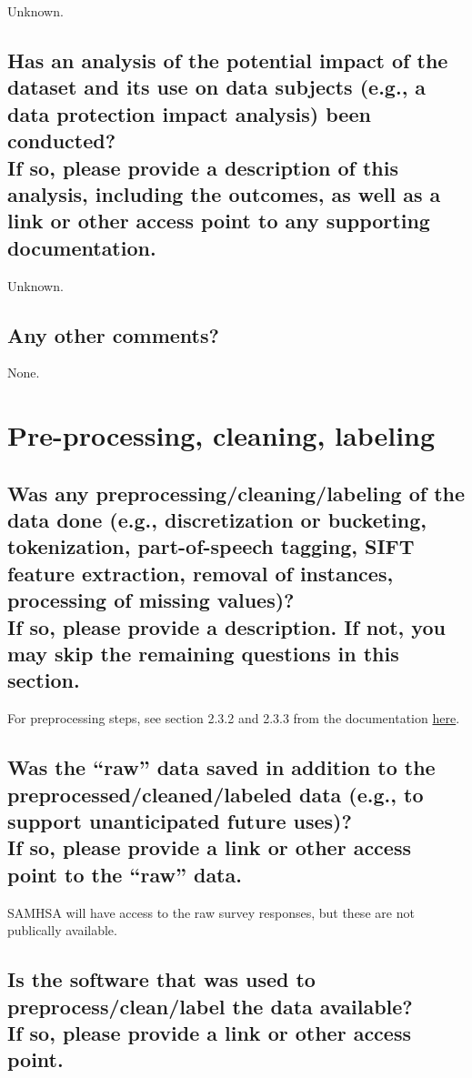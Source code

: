 \documentclass[letterpaper, 10 pt, conference]{ieeeconf}  %
\newcommand{\subtitle}[1]{{\\ \small \normalfont \color{purple} #1}}
\begin{document}
Unknown.

\subsection{Has an analysis of the potential impact of the dataset and its use on data subjects (e.g., a data protection impact analysis) been conducted? \subtitle{If so, please provide a description of this analysis, including the outcomes, as well as a link or other access point to any supporting documentation.}}

Unknown.

\subsection{Any other comments?}

None.

\section{Pre-processing, cleaning, labeling}

\subsection{Was any preprocessing/cleaning/labeling of the data done (e.g., discretization or bucketing, tokenization, part-of-speech tagging, SIFT feature extraction, removal of instances, processing of missing values)? \subtitle{If so, please provide a description. If not, you may skip the remaining questions in this section.}}

For preprocessing steps, see section 2.3.2 and 2.3.3 from the documentation \href{https://www.samhsa.gov/data/sites/default/files/reports/rpt35330/2020NSDUHMethodSummDefs091721.pdf}{here}.

\subsection{Was the “raw” data saved in addition to the preprocessed/cleaned/labeled data (e.g., to support unanticipated future uses)? \subtitle{If so, please provide a link or other access point to the “raw” data. }}

SAMHSA will have access to the raw survey responses, but these are not publically available.

\subsection{Is the software that was used to preprocess/clean/label the data available? \subtitle{If so, please provide a link or other access point.}}
\end{document}
